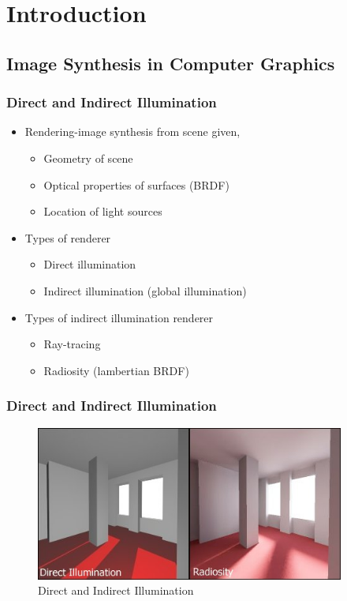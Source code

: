 
\section{Introduction} 

  \subsection{Image Synthesis in Computer Graphics}

      \begin{frame}\frametitle{Direct and Indirect Illumination}
      \begin{itemize}
      \setlength\itemsep{1.5 em}
      \item Rendering-image synthesis from scene given,
      \begin{itemize}
      \item Geometry of scene
      \item Optical properties of surfaces (BRDF)
      \item Location of light sources
      \end{itemize}
      \item Types of renderer
      \begin{itemize}
      \setlength\itemsep{0.5 em}
      \item Direct illumination
      \item Indirect illumination (global illumination)
      \end{itemize}
      \item Types of indirect illumination renderer
      \begin{itemize}
      \setlength\itemsep{0.5 em}
      \item Ray-tracing
      \item Radiosity (lambertian BRDF)
      \end{itemize}
      \end{itemize}
      \end{frame}



      \begin{frame}\frametitle{Direct and Indirect Illumination}
       \begin{figure}
        \centering
        \includegraphics[width=4in]{DirectIndirect.jpg}
        \caption{Direct and Indirect Illumination}
        \label{idealscalable}
        \end{figure}
      \end{frame}



